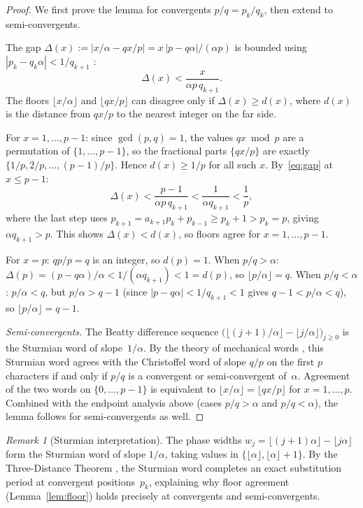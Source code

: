 \documentclass[11pt]{article}
\theoremstyle{definition}
\theoremstyle{remark}
\newtheorem{remark}[theorem]{Remark}
\newcommand{\floor}[1]{\lfloor #1 \rfloor}
\begin{document}
\begin{proof}
We first prove the lemma for convergents $p/q = p_k/q_k$, then extend to semi-convergents.

The gap $\Delta(x) := |x/\alpha - qx/p| = x\,|p - q\alpha|/(\alpha p)$ is bounded using
$|p_k - q_k\alpha| < 1/q_{k+1}$ \cite[Theorem~13]{Khinchin1964}:
\begin{equation}\label{eq:gap}
  \Delta(x) < \frac{x}{\alpha p\, q_{k+1}}.
\end{equation}
The floors $\floor{x/\alpha}$ and $\floor{qx/p}$ can disagree only if $\Delta(x) \geq d(x)$, where $d(x)$ is the distance from $qx/p$ to the nearest integer on the far side.

For $x = 1, \ldots, p-1$: since $\gcd(p,q)=1$, the values $qx \bmod p$ are a permutation of $\{1, \ldots, p-1\}$, so the fractional parts $\{qx/p\}$ are exactly $\{1/p, 2/p, \ldots, (p-1)/p\}$.
Hence $d(x) \geq 1/p$ for all such $x$.
By~\eqref{eq:gap} at $x \leq p-1$:
\[
  \Delta(x) < \frac{p-1}{\alpha p\, q_{k+1}} < \frac{1}{\alpha q_{k+1}} < \frac{1}{p},
\]
where the last step uses $p_{k+1} = a_{k+1}p_k + p_{k-1} \geq p_k + 1 > p_k = p$, giving $\alpha q_{k+1} > p$.
This shows $\Delta(x) < d(x)$, so floors agree for $x = 1, \ldots, p-1$.

For $x = p$: $qp/p = q$ is an integer, so $d(p) = 1$.
When $p/q > \alpha$: $\Delta(p) = (p - q\alpha)/\alpha < 1/(\alpha q_{k+1}) < 1 = d(p)$, so $\floor{p/\alpha} = q$.
When $p/q < \alpha$: $p/\alpha < q$, but $p/\alpha > q-1$ (since $|p - q\alpha| < 1/q_{k+1} < 1$ gives $q - 1 < p/\alpha < q$), so $\floor{p/\alpha} = q - 1$.

\emph{Semi-convergents.}
The Beatty difference sequence $\bigl(\floor{(j{+}1)/\alpha} - \floor{j/\alpha}\bigr)_{j \geq 0}$ is the Sturmian word of slope~$1/\alpha$.
By the theory of mechanical words \cite[Ch.~2, Prop.~2.1.18 and Thm.~2.1.13]{Lothaire2002}, this Sturmian word agrees with the Christoffel word of slope $q/p$ on the first $p$ characters if and only if $p/q$ is a convergent or semi-convergent of~$\alpha$.
Agreement of the two words on $\{0, \ldots, p-1\}$ is equivalent to $\floor{x/\alpha} = \floor{qx/p}$ for $x = 1, \ldots, p$.
Combined with the endpoint analysis above (cases $p/q > \alpha$ and $p/q < \alpha$), the lemma follows for semi-convergents as well.
\end{proof}

\begin{remark}[Sturmian interpretation]
The phase widths $w_j = \floor{(j+1)\alpha} - \floor{j\alpha}$ form the Sturmian word of slope $1/\alpha$, taking values in $\{\floor{\alpha}, \floor{\alpha}+1\}$.
By the Three-Distance Theorem \cite{Sos1957}, the Sturmian word completes an exact substitution period at convergent positions~$p_k$, explaining why floor agreement (Lemma~\ref{lem:floor}) holds precisely at convergents and semi-convergents.
\end{remark}
\end{document}
